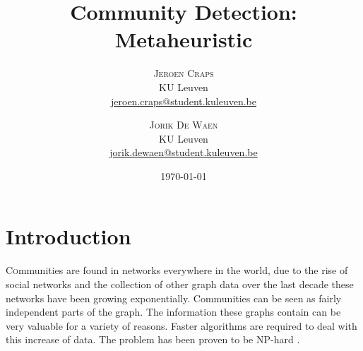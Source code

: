 \documentclass[twoside,twocolumn]{article}
\title{Community Detection: Metaheuristic} %
\author{%
\textsc{Jeroen Craps} \\[1ex] %
\normalsize KU Leuven \\ %
\normalsize \href{mailto:jeroen.craps@student.kuleuven.be}{jeroen.craps@student.kuleuven.be} %
\and %
\textsc{Jorik De Waen} \\[1ex] %
\normalsize KU Leuven \\ %
\normalsize \href{mailto:jorik.dewaen@student.kuleuven.be}{jorik.dewaen@student.kuleuven.be} %
}
\date{\today} %
\begin{document}
\maketitle


\section{Introduction}

\lettrine[nindent=0em,lines=3]{C} ommunities are found in networks everywhere in the world, due to the rise of social networks and the collection of other graph data over the last decade these networks have been growing exponentially.
Communities can be seen as fairly independent parts of the graph.
The information these graphs contain can be very valuable for a variety of reasons.
Faster algorithms are required to deal with this increase of data. 
The problem has been proven to be NP-hard \cite{Fortunato2010}.

\end{document}
